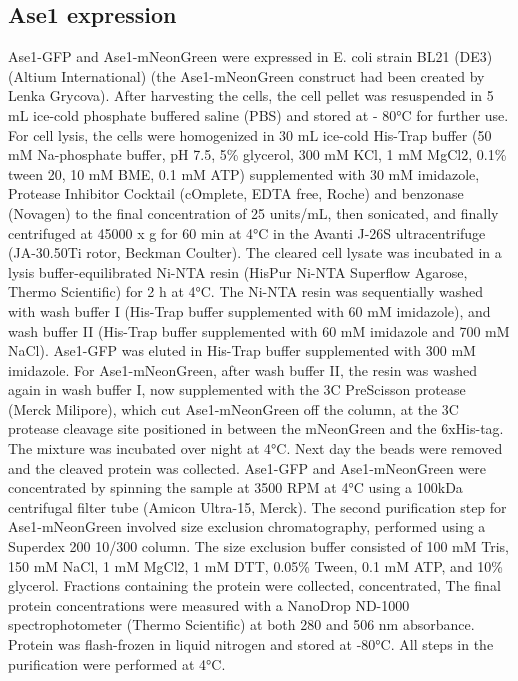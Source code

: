 \subsection{Ase1 expression}
Ase1-GFP \parencite{Janson2007} and Ase1-mNeonGreen were expressed in E. coli strain BL21 (DE3) (Altium International) \alert{(the Ase1-mNeonGreen construct had been created by Lenka Grycova)}. After harvesting the cells, the cell pellet was resuspended in 5 mL ice-cold phosphate buffered saline (PBS) and stored at - 80°C for further use. For cell lysis, the cells were homogenized in 30 mL ice-cold His-Trap buffer (50 mM Na-phosphate buffer, pH 7.5, 5\% glycerol, 300 mM KCl, 1 mM MgCl2, 0.1\% tween 20, 10 mM BME, 0.1 mM ATP) supplemented with 30 mM imidazole, Protease Inhibitor Cocktail (cOmplete, EDTA free, Roche) and benzonase (Novagen) to the final concentration of 25 units/mL, then sonicated, and finally centrifuged at 45000 x g for 60 min at 4°C in the Avanti J-26S ultracentrifuge (JA-30.50Ti rotor, Beckman Coulter). The cleared cell lysate was incubated in a lysis buffer-equilibrated Ni-NTA resin (HisPur Ni-NTA Superflow Agarose, Thermo Scientific) for 2 h at 4°C. The Ni-NTA resin was sequentially washed with wash buffer I (His-Trap buffer supplemented with 60 mM imidazole), and wash buffer II (His-Trap buffer supplemented with 60 mM imidazole and 700 mM NaCl). Ase1-GFP was eluted in His-Trap buffer supplemented with 300 mM imidazole. For Ase1-mNeonGreen, after wash buffer II, the resin was washed again in wash buffer I, now supplemented with the 3C PreScisson protease (Merck Milipore), which cut Ase1-mNeonGreen off the column, at the 3C protease cleavage site positioned in between the mNeonGreen and the 6xHis-tag. The mixture was incubated over night at 4°C. Next day the beads were removed and the cleaved protein was collected. Ase1-GFP and Ase1-mNeonGreen were concentrated by spinning the sample at 3500 RPM at 4°C using a 100kDa centrifugal filter tube (Amicon Ultra-15, Merck). The second purification step for Ase1-mNeonGreen involved size exclusion chromatography, performed using a Superdex 200 10/300 column. The size exclusion buffer consisted of 100 mM Tris, 150 mM NaCl, 1 mM MgCl2, 1 mM DTT, 0.05\% Tween, 0.1 mM ATP, and 10\% glycerol. Fractions containing the protein were collected, concentrated, The final protein concentrations were measured with a NanoDrop ND-1000 spectrophotometer (Thermo Scientific) at both 280 and 506 nm absorbance. Protein was flash-frozen in liquid nitrogen and stored at -80°C. All steps in the purification were performed at 4°C.

